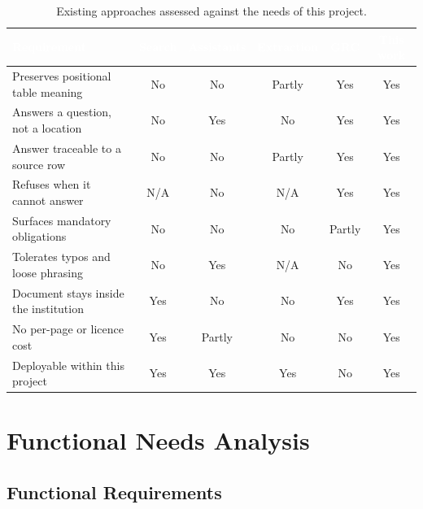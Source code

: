 \begin{table}[h]
\centering
\caption{Existing approaches assessed against the needs of this project.}
\label{tab:existing}
\small
\begin{tabular}{|p{}|c|c|c|c|c|}
\hline
\rowcolor{myblue}
\textcolor{white}{\textbf{Requirement}} &
\textcolor{white}{\textbf{Search}} &
\textcolor{white}{\textbf{Assistants}} &
\textcolor{white}{\textbf{Extraction}} &
\textcolor{white}{\textbf{GRC}} &
\textcolor{white}{\textbf{This work}} \\
\hline
Preserves positional table meaning & No & No & Partly & Yes & Yes \\ \hline
Answers a question, not a location & No & Yes & No & Yes & Yes \\ \hline
Answer traceable to a source row & No & No & Partly & Yes & Yes \\ \hline
Refuses when it cannot answer & N/A & No & N/A & Yes & Yes \\ \hline
Surfaces mandatory obligations & No & No & No & Partly & Yes \\ \hline
Tolerates typos and loose phrasing & No & Yes & N/A & No & Yes \\ \hline
Document stays inside the institution & Yes & No & No & Yes & Yes \\ \hline
No per-page or licence cost & Yes & Partly & No & No & Yes \\ \hline
Deployable within this project & Yes & Yes & Yes & No & Yes \\ \hline
\end{tabular}
\end{table}

\section{Functional Needs Analysis}


\subsection{Functional Requirements}

